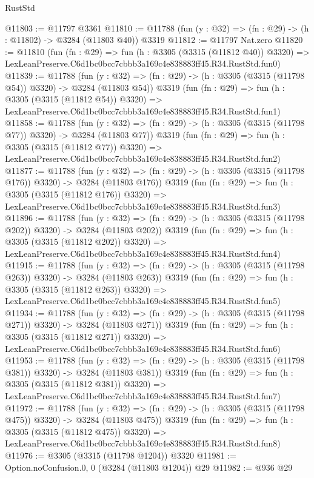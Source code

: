 \begin{lexlean}{RustStd}
\begin{coremodule}
@11803 := @11797 @3361
@11810 := @11788 (fun (y : @32) => (fn : @29) -> (h : @11802) -> @3284 (@11803 @40)) @3319
@11812 := @11797 Nat.zero
@11820 := @11810
    (fun (fn : @29) =>
    fun (h : @3305 (@3315 (@11812 @40)) @3320) =>
    LexLeanPreserve.C6d1bc0bcc7cbbb3a169c4e838883ff45.R34.RustStd.fun0)
@11839 := @11788
    (fun (y : @32) => (fn : @29) -> (h : @3305 (@3315 (@11798 @54)) @3320) -> @3284 (@11803 @54))
    @3319
    (fun (fn : @29) =>
    fun (h : @3305 (@3315 (@11812 @54)) @3320) =>
    LexLeanPreserve.C6d1bc0bcc7cbbb3a169c4e838883ff45.R34.RustStd.fun1)
@11858 := @11788
    (fun (y : @32) => (fn : @29) -> (h : @3305 (@3315 (@11798 @77)) @3320) -> @3284 (@11803 @77))
    @3319
    (fun (fn : @29) =>
    fun (h : @3305 (@3315 (@11812 @77)) @3320) =>
    LexLeanPreserve.C6d1bc0bcc7cbbb3a169c4e838883ff45.R34.RustStd.fun2)
@11877 := @11788
    (fun (y : @32) => (fn : @29) -> (h : @3305 (@3315 (@11798 @176)) @3320) -> @3284 (@11803 @176))
    @3319
    (fun (fn : @29) =>
    fun (h : @3305 (@3315 (@11812 @176)) @3320) =>
    LexLeanPreserve.C6d1bc0bcc7cbbb3a169c4e838883ff45.R34.RustStd.fun3)
@11896 := @11788
    (fun (y : @32) => (fn : @29) -> (h : @3305 (@3315 (@11798 @202)) @3320) -> @3284 (@11803 @202))
    @3319
    (fun (fn : @29) =>
    fun (h : @3305 (@3315 (@11812 @202)) @3320) =>
    LexLeanPreserve.C6d1bc0bcc7cbbb3a169c4e838883ff45.R34.RustStd.fun4)
@11915 := @11788
    (fun (y : @32) => (fn : @29) -> (h : @3305 (@3315 (@11798 @263)) @3320) -> @3284 (@11803 @263))
    @3319
    (fun (fn : @29) =>
    fun (h : @3305 (@3315 (@11812 @263)) @3320) =>
    LexLeanPreserve.C6d1bc0bcc7cbbb3a169c4e838883ff45.R34.RustStd.fun5)
@11934 := @11788
    (fun (y : @32) => (fn : @29) -> (h : @3305 (@3315 (@11798 @271)) @3320) -> @3284 (@11803 @271))
    @3319
    (fun (fn : @29) =>
    fun (h : @3305 (@3315 (@11812 @271)) @3320) =>
    LexLeanPreserve.C6d1bc0bcc7cbbb3a169c4e838883ff45.R34.RustStd.fun6)
@11953 := @11788
    (fun (y : @32) => (fn : @29) -> (h : @3305 (@3315 (@11798 @381)) @3320) -> @3284 (@11803 @381))
    @3319
    (fun (fn : @29) =>
    fun (h : @3305 (@3315 (@11812 @381)) @3320) =>
    LexLeanPreserve.C6d1bc0bcc7cbbb3a169c4e838883ff45.R34.RustStd.fun7)
@11972 := @11788
    (fun (y : @32) => (fn : @29) -> (h : @3305 (@3315 (@11798 @475)) @3320) -> @3284 (@11803 @475))
    @3319
    (fun (fn : @29) =>
    fun (h : @3305 (@3315 (@11812 @475)) @3320) =>
    LexLeanPreserve.C6d1bc0bcc7cbbb3a169c4e838883ff45.R34.RustStd.fun8)
@11976 := @3305 (@3315 (@11798 @1204)) @3320
@11981 := Option.noConfusion.{0, 0} (@3284 (@11803 @1204)) @29
@11982 := @936 @29

\end{coremodule}
\end{lexlean}
